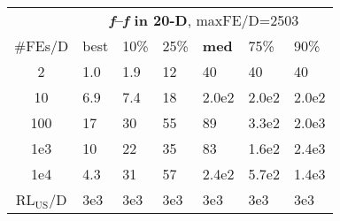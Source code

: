 \begin{tabular}{c|llllll}
 & \multicolumn{6}{|c}{\textbf{\textit{f}\raisebox{-0.35ex}{1}--\textit{f}\raisebox{-0.35ex}{24} in 20-D}, maxFE/D=2503}\\
\#FEs/D & best & 10\% & 25\% & \textbf{med} & 75\% & 90\%\\
2 & \hspace*{1ex}1.0 & \hspace*{1ex}1.9 & 12 & 40 & 40 & 40\\
10 & \hspace*{1ex}6.9 & \hspace*{1ex}7.4 & 18 & 2.0e2 & 2.0e2 & 2.0e2\\
100 & 17 & 30 & 55 & 89 & 3.3e2 & 2.0e3\\
1e3 & 10 & 22 & 35 & 83 & 1.6e2 & 2.4e3\\
1e4 & \hspace*{1ex}4.3 & 31 & 57 & 2.4e2 & 5.7e2 & 1.4e3\\
$\text{RL}_{\text{US}}$/D & 3e3 & 3e3 & 3e3 & 3e3 & 3e3 & 3e3
\end{tabular}
